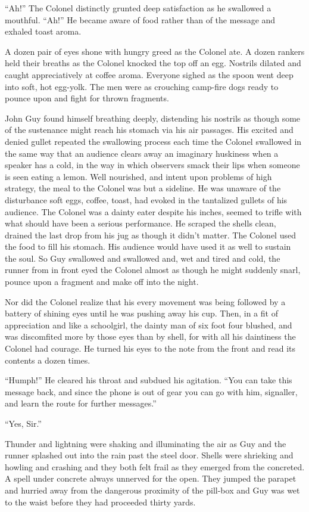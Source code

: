 ``Ah!'' The Colonel distinctly grunted deep satisfaction as he swallowed a mouthful. ``Ah!'' He became aware of food rather than of the message and exhaled toast aroma.

A dozen pair of eyes shone with hungry greed as the Colonel ate. A dozen rankers held their breaths as the Colonel knocked the top off an egg. Nostrils dilated and caught appreciatively at coffee aroma. Everyone sighed as the spoon went deep into soft, hot egg-yolk. The men were as crouching camp-fire dogs ready to pounce upon and fight for thrown fragments.

John Guy found himself breathing deeply, distending his nostrils as though some of the sustenance might reach his stomach via his air passages. His excited and denied gullet repeated the swallowing process each time the Colonel swallowed in the same way that an audience clears away an imaginary huskiness when a speaker has a cold, in the way in which observers smack their lips when someone is seen eating a lemon. Well nourished, and intent upon problems of high strategy, the meal to the Colonel was but a sideline. He was unaware of the disturbance soft eggs, coffee, toast, had evoked in the tantalized gullets of his audience. The Colonel was a dainty eater despite his inches, seemed to trifle with what should have been a serious performance. He scraped the shells clean, drained the last drop from his jug as though it didn't matter. The Colonel used the food to fill his stomach. His audience would have used it as well to sustain the soul. So Guy swallowed and swallowed and, wet and tired and cold, the runner from in front eyed the Colonel almost as though he might suddenly snarl, pounce upon a fragment and make off into the night.

Nor did the Colonel realize that his every movement was being followed by a battery of shining eyes until he was pushing away his cup. Then, in a fit of appreciation and like a schoolgirl, the dainty man of six foot four blushed, and was discomfited more by those eyes than by shell, for with all his daintiness the Colonel had courage. He turned his eyes to the note from the front and read its contents a dozen times.

``Humph!'' He cleared his throat and subdued his agitation. ``You can take this message back, and since the phone is out of gear you can go with him, signaller, and learn the route for further messages.''

``Yes, Sir.''

Thunder and lightning were shaking and illuminating the air as Guy and the runner splashed out into the rain past the steel door. Shells were shrieking and howling and crashing and they both felt frail as they emerged from the concreted. A spell under concrete always unnerved for the open. They jumped the parapet and hurried away from the dangerous proximity of the pill-box and Guy was wet to the waist before they had proceeded thirty yards.

